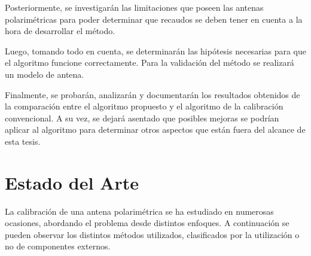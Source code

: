 \documentclass[a4paper,10pt]{article}
\begin{document}
		Posteriormente, se investigarán las limitaciones que poseen las antenas 
	polarimétricas para poder determinar que recaudos se deben tener en cuenta a
	la hora de desarrollar el método.

		Luego, tomando todo en cuenta, se determinarán las hipótesis necesarias
	para que el algoritmo funcione correctamente. Para la validación del método
	se realizará un modelo de antena.
		
		Finalmente, se probarán, analizarán y documentarán los resultados 
	obtenidos de la comparación entre el algoritmo propuesto y el algoritmo de
	la calibración convencional. A su vez, se dejará asentado que posibles 
	mejoras se podrían aplicar al algoritmo para determinar otros aspectos que
	están fuera del alcance de esta tesis.

	\section{Estado del Arte}
		La calibración de una antena polarimétrica se ha estudiado en numerosas 
	ocasiones, abordando el problema desde distintos enfoques. A continuación se
    pueden observar los distintos métodos utilizados, clasificados por la 
    utilización o no de componentes externos.
\end{document}
